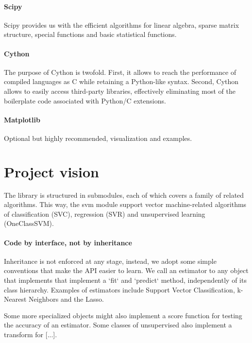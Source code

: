 \documentclass[twoside,11pt]{article}
\begin{document}
\paragraph{Scipy} 

Scipy provides us with the efficient algorithms for linear algebra,
sparse matrix structure, special functions and basic statistical
functions.

\paragraph{Cython}

The purpose of Cython is twofold. First, it allows to reach the
performance of compiled languages as C while retaining a Python-like
syntax. Second, Cython allows to easily access third-party libraries,
effectively eliminating most of the boilerplate code associated with
Python/C extensions.

\paragraph{Matplotlib}

Optional but highly recommended, visualization and examples.



\section {Project vision}


The library is structured in submodules, each of which covers a family
of related algorithms. This way, the svm module support vector
machine-related algorithms of classification (SVC), regression (SVR)
and unsupervised learning (OneClassSVM).


\paragraph{Code by interface, not by inheritance}

Inheritance is not enforced at any stage, instead, we adopt some
simple conventions that make the API easier to learn. We call an
estimator to any object that implements that implement a `fit` and
`predict` method, independently of its class hierarchy. Examples of
estimators include Support Vector Classification, k-Nearest Neighbors
and the Lasso.

Some more specialized objects might also implement a score function
for testing the accuracy of an estimator. Some classes of unsupervised
also implement a transform for [...].
\end{document}

